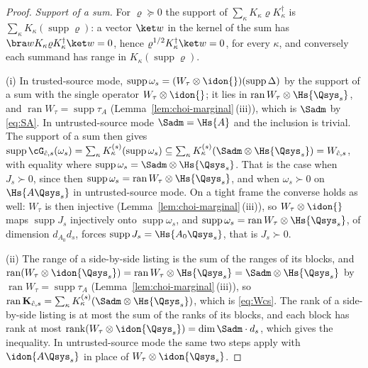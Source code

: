 \begin{proof}
\emph{Support of a sum.} For $\varrho\succeq0$ the support of
$\sum_{\kappa}K_{\kappa}\varrho K_{\kappa}^{\dagger}$ is
$\sum_{\kappa}K_{\kappa}(\operatorname{supp}\varrho)$: a vector $\ket w$
in the kernel of the sum has
$\bra wK_{\kappa}\varrho K_{\kappa}^{\dagger}\ket w=0$, hence
$\varrho^{1/2}K^{\dagger}_{\kappa}\ket w=0$, for every $\kappa$, and
conversely each summand has range in $K_{\kappa}(\operatorname{supp}
\varrho)$.

(i) In trusted-source mode,
$\operatorname{supp}\omega_s=(W_{\tau}\otimes\idon{})(\operatorname{supp}\Delta)$
by the support of a sum with the single operator $W_{\tau}\otimes\idon{}$;
it lies in $\operatorname{ran}W_{\tau}\otimes\Hs{\Qsys_s}$, and
$\operatorname{ran}W_{\tau}=\operatorname{supp}\tau_A$
(Lemma~\ref{lem:choi-marginal}\,(iii)), which is $\Sadm$ by \eqref{eq:SA}. In
untrusted-source mode $\Sadm=\Hs{A}$ and the inclusion is trivial. The
support of a sum then gives
$\operatorname{supp}\cG_{\hat c,s}(\omega_s)
=\sum_{\kappa}K^{(s)}_{\kappa}(\operatorname{supp}\omega_s)
\subseteq\sum_{\kappa}K^{(s)}_{\kappa}(\Sadm\otimes\Hs{\Qsys_s})
=W_{\hat c,s}$, with equality where
$\operatorname{supp}\omega_s=\Sadm\otimes\Hs{\Qsys_s}$. That is the case
when $J_s\succ0$, since then
$\operatorname{supp}\omega_s=\operatorname{ran}W_{\tau}\otimes\Hs{\Qsys_s}$,
and when $\omega_s\succ0$ on $\Hs{A\Qsys_s}$ in untrusted-source mode. On a
tight frame the converse holds as well: $W_{\tau}$ is then injective
(Lemma~\ref{lem:choi-marginal}\,(iii)), so $W_{\tau}\otimes\idon{}$ maps
$\operatorname{supp}J_s$ injectively onto $\operatorname{supp}\omega_s$,
and $\operatorname{supp}\omega_s=\operatorname{ran}W_{\tau}\otimes
\Hs{\Qsys_s}$, of dimension $d_{A_0}d_s$, forces
$\operatorname{supp}J_s=\Hs{A_0\Qsys_s}$, that is $J_s\succ0$.

(ii) The range of a side-by-side listing is the sum of the ranges of its
blocks, and
$\operatorname{ran}(W_{\tau}\otimes\idon{\Qsys_s})
=\operatorname{ran}W_{\tau}\otimes\Hs{\Qsys_s}
=\Sadm\otimes\Hs{\Qsys_s}$ by
$\operatorname{ran}W_{\tau}=\operatorname{supp}\tau_A$
(Lemma~\ref{lem:choi-marginal}\,(iii)), so
$\operatorname{ran}\mathbf K_{\hat c,s}
=\sum_{\kappa}K^{(s)}_{\kappa}(\Sadm\otimes\Hs{\Qsys_s})$, which is
\eqref{eq:Wcs}. The rank of a side-by-side listing is at most the sum of
the ranks of its blocks, and each block has rank at most
$\operatorname{rank}(W_{\tau}\otimes\idon{\Qsys_s})=\dim\Sadm\cdot d_s$,
which gives the inequality. In untrusted-source mode the same two steps
apply with $\idon{A\Qsys_s}$ in place of $W_{\tau}\otimes\idon{\Qsys_s}$.


\end{proof}
